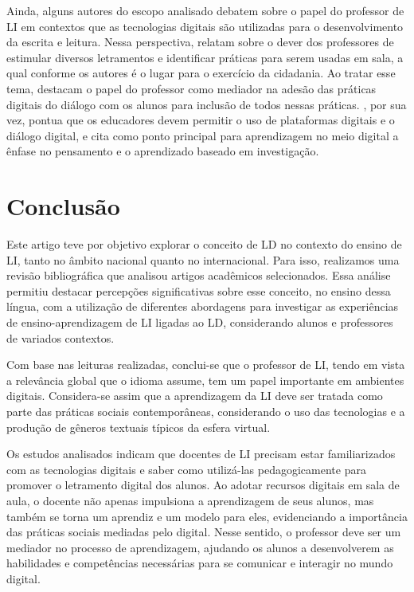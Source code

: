 Ainda, alguns autores do escopo analisado debatem sobre o papel do
professor de LI em contextos que as tecnologias digitais são utilizadas
para o desenvolvimento da escrita e leitura. Nessa perspectiva,
\textcite{oliveira2018multiletramentos} relatam sobre o dever dos professores de
estimular diversos letramentos e identificar práticas para serem usadas
em sala, a qual conforme os autores é o lugar para o exercício da
cidadania. Ao tratar esse tema, \textcite{valadares2021videogames} destacam o
papel do professor como mediador na adesão das práticas digitais do
diálogo com os alunos para inclusão de todos nessas práticas. \textcite{cladis2020shifting}, por sua vez, pontua que os educadores devem permitir o uso de
plataformas digitais e o diálogo digital, e cita como ponto principal
para aprendizagem no meio digital a ênfase no pensamento e o aprendizado
baseado em investigação.

\section{Conclusão}

Este artigo teve por objetivo explorar o conceito de LD no contexto do ensino de LI, tanto no âmbito nacional quanto no internacional. Para isso, realizamos uma revisão bibliográfica que analisou artigos acadêmicos selecionados. Essa análise permitiu destacar percepções significativas sobre esse conceito, no ensino dessa língua, com a utilização de diferentes abordagens para investigar as experiências de ensino-aprendizagem de LI ligadas ao LD, considerando alunos e professores de variados contextos.

Com base nas leituras realizadas, conclui-se que o professor de LI, tendo em vista a relevância global que o idioma assume, tem um papel importante em ambientes digitais. Considera-se assim que a aprendizagem da LI deve ser tratada como parte das práticas sociais contemporâneas, considerando o uso das tecnologias e a produção de gêneros textuais típicos da esfera virtual.

Os estudos analisados indicam que docentes de LI precisam estar familiarizados com as tecnologias digitais e saber como utilizá-las pedagogicamente para promover o letramento digital dos alunos. Ao adotar recursos digitais em sala de aula, o docente não apenas impulsiona a aprendizagem de seus alunos, mas também se torna um aprendiz e um modelo para eles, evidenciando a importância das práticas sociais mediadas pelo digital. Nesse sentido, o professor deve ser um mediador no processo de aprendizagem, ajudando os alunos a desenvolverem as habilidades e competências necessárias para se comunicar e interagir no mundo digital.

